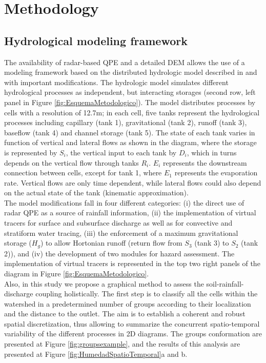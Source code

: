 \documentclass[hess, manuscript]{copernicus}
\begin{document}
\section{Methodology}
\label{sec:methods}

\subsection{Hydrological modeling framework}

The availability of radar-based QPE and a detailed DEM allows the use of a modeling framework based on the distributed hydrologic model described in \citet{Velez2001} and \citet{Frances2007b} with important modifications. The hydrologic model simulates different hydrological processes as independent, but interacting storages (second row, left panel in Figure \ref{fig:EsquemaMetodologico}).  The model distributes processes by cells with a resolution of 12.7m; in each cell, five tanks represent the hydrological processes including capillary (tank 1), gravitational (tank 2), runoff (tank 3), baseflow (tank 4) and channel storage (tank 5).  The state of each tank varies in function of vertical and lateral flows as shown in the diagram, where the storage is represented by $S_i$, the vertical input to each tank by $D_i$, which in turns depends on the vertical flow through tanks $R_i$. $E_i$ represents the downstream connection between cells, except for tank 1, where $E_1$ represents the evaporation rate. Vertical flows are only time dependent, while lateral flows could also depend on the actual state of the tank (kinematic approximation).\\

The model modifications fall in four different categories: (i) the direct use of radar QPE as a source of rainfall information, (ii) the implementation of virtual tracers for surface and subsurface discharge  as well as for convective and stratiform water tracing,  (iii)  the enforcement of a maximum gravitational storage ($H_{g}$) to allow Hortonian runoff (return flow from $S_3$ (tank 3) to $S_2$ (tank 2)), and (iv)  the development of two modules for hazard assessment. The implementation of virtual tracers is represented in the top two right panels of the diagram in Figure \ref{fig:EsquemaMetodologico}.\\

Also, in this study we propose a graphical method to assess the soil-rainfall-discharge coupling holistically. The first step is to classify all the cells within the watershed in a predetermined number of groups according to their localization and the distance to the outlet. The aim is to establish a coherent and robust spatial discretization, thus allowing to summarize the concurrent spatio-temporal variability of the different processes in 2D diagrams.  The groups conformation are presented at Figure \ref{fig:groupsexample}, and the results of this analysis are presented at Figure \ref{fig:HumedadSpatioTemporal}a and b.\\
\end{document}

